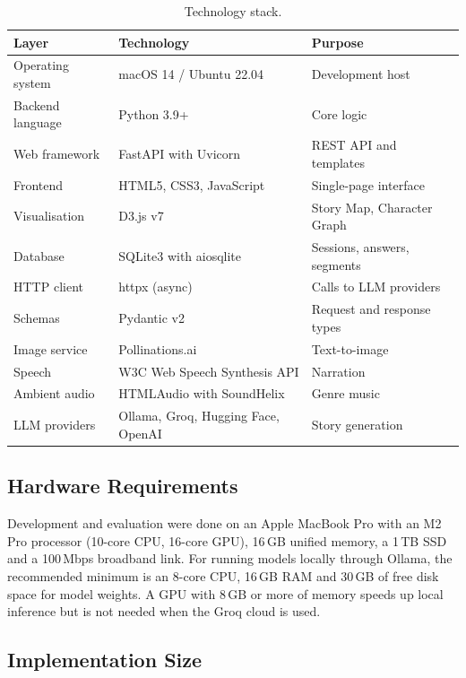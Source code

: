 \begin{table}[H]
\centering
\caption{Technology stack.}
\label{tab:stack}
\renewcommand{\arraystretch}{1.2}
\small
\begin{tabular}{|l|l|l|}
\hline
\textbf{Layer} & \textbf{Technology} & \textbf{Purpose} \\
\hline
Operating system & macOS 14 / Ubuntu 22.04          & Development host \\
Backend language & Python 3.9+                      & Core logic \\
Web framework    & FastAPI with Uvicorn             & REST API and templates \\
Frontend         & HTML5, CSS3, JavaScript          & Single-page interface \\
Visualisation    & D3.js v7                         & Story Map, Character Graph \\
Database         & SQLite3 with aiosqlite           & Sessions, answers, segments \\
HTTP client      & httpx (async)                    & Calls to LLM providers \\
Schemas          & Pydantic v2                      & Request and response types \\
Image service    & Pollinations.ai                  & Text-to-image \\
Speech           & W3C Web Speech Synthesis API     & Narration \\
Ambient audio    & HTMLAudio with SoundHelix        & Genre music \\
LLM providers    & Ollama, Groq, Hugging Face, OpenAI & Story generation \\
\hline
\end{tabular}
\end{table}

\subsection{Hardware Requirements}

Development and evaluation were done on an Apple MacBook Pro with an M2 Pro processor (10-core CPU, 16-core GPU), 16\,GB unified memory, a 1\,TB SSD and a 100\,Mbps broadband link. For running models locally through Ollama, the recommended minimum is an 8-core CPU, 16\,GB RAM and 30\,GB of free disk space for model weights. A GPU with 8\,GB or more of memory speeds up local inference but is not needed when the Groq cloud is used.

\subsection{Implementation Size}

